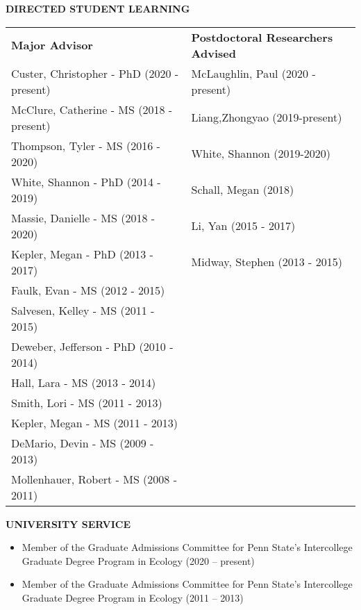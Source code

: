 \documentclass[10pt]{article}
\begin{document}
\begin{flushleft}
\begin{itemize}
\end{itemize}

\vspace{8pt}


\centerline {\bf{DIRECTED STUDENT LEARNING}}
\vspace{5pt}
\begin{tabularx}{\textwidth}{ XX }

\textbf{Major Advisor} & \textbf{Postdoctoral Researchers Advised} \\

Custer, Christopher - PhD (2020 - present) &  McLaughlin, Paul (2020 - present)\\
McClure, Catherine - MS (2018 - present) &  Liang,Zhongyao (2019-present)\\
Thompson, Tyler - MS (2016 - 2020) &   White, Shannon (2019-2020)\\
White, Shannon - PhD (2014 - 2019)  &  Schall, Megan (2018)\\
Massie, Danielle - MS (2018 - 2020) &  Li, Yan (2015 - 2017)\\
Kepler, Megan - PhD (2013 - 2017) & Midway, Stephen (2013 - 2015)\\
Faulk, Evan - MS (2012 - 2015) &  \\
Salvesen, Kelley - MS (2011 - 2015) & \\
Deweber, Jefferson - PhD (2010 - 2014) & \\
Hall, Lara - MS (2013 - 2014) & \\
Smith, Lori - MS (2011 - 2013) & \\
Kepler, Megan - MS (2011 - 2013) & \\
DeMario, Devin - MS (2009 - 2013) & \\
Mollenhauer, Robert - MS (2008 - 2011) & \\
\end{tabularx}



\end{flushleft}

\centerline {\bf{UNIVERSITY SERVICE}}
\vspace{5pt}
\begin{itemize}
\item Member of the Graduate Admissions Committee for Penn State's Intercollege Graduate Degree Program in Ecology (2020 -- present)
\item Member of the Graduate Admissions Committee for Penn State's Intercollege Graduate Degree Program in Ecology (2011 -- 2013) 
\end{itemize}
\end{document}
